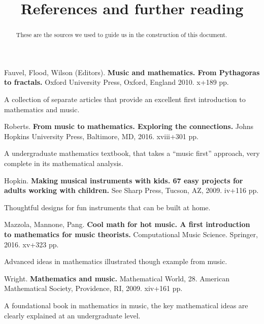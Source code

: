 \documentclass[12pt]{ximera}
\title{References and further reading}
\begin{document}
\begin{abstract}
  These are the sources we used to guide us in the construction of this
  document.
\end{abstract}
\maketitle


\begin{thebibliography}{MMMM2002}


 Fauvel, Flood, Wilson (Editors).
\textbf{Music and mathematics.
From Pythagoras to fractals.}  Oxford University Press, Oxford, England 2010. x+189 pp.\begin{annotate}
    A collection of separate articles that provide an excellent first introduction to mathematics and music.
  \end{annotate}



 Roberts.
\textbf{From music to mathematics.
Exploring the connections.}  Johns Hopkins University Press, Baltimore, MD, 2016. xviii+301 pp.
  \begin{annotate}
    A undergraduate mathematics textbook, that takes a  ``music first'' approach, very complete in its mathematical analysis.
  \end{annotate}



 Hopkin.
\textbf{Making musical instruments with kids. 67 easy projects for adults working with children.}  See Sharp Press, Tucson, AZ, 2009. iv+116 pp.
  \begin{annotate}
    Thoughtful designs for fun instruments that can be built at home.
  \end{annotate}



 Mazzola, Mannone, Pang.
\textbf{Cool math for hot music.
A first introduction to mathematics for music theorists.} Computational Music Science. Springer, 2016. xv+323 pp.
  \begin{annotate}
    Advanced ideas in mathematics illustrated though example from music.
  \end{annotate}
  
 Wright. \textbf{Mathematics and music.}
Mathematical World, 28. American Mathematical Society, Providence, RI, 2009. xiv+161 pp.
  \begin{annotate}
    A foundational book in mathematics in music, the key mathematical ideas are clearly explained at an undergraduate level. 
  \end{annotate}
  
  

  
\end{thebibliography}
\end{document}

